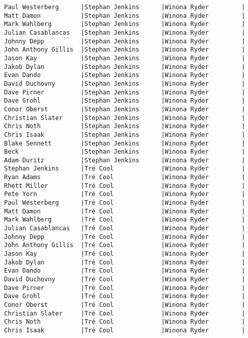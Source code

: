 \documentclass{article}
\begin{document}
\begin{verbatim}
Paul Westerberg      |Stephan Jenkins      |Winona Ryder         |
Matt Damon           |Stephan Jenkins      |Winona Ryder         |
Mark Wahlberg        |Stephan Jenkins      |Winona Ryder         |
Julian Casablancas   |Stephan Jenkins      |Winona Ryder         |
Johnny Depp          |Stephan Jenkins      |Winona Ryder         |
John Anthony Gillis  |Stephan Jenkins      |Winona Ryder         |
Jason Kay            |Stephan Jenkins      |Winona Ryder         |
Jakob Dylan          |Stephan Jenkins      |Winona Ryder         |
Evan Dando           |Stephan Jenkins      |Winona Ryder         |
David Duchovny       |Stephan Jenkins      |Winona Ryder         |
Dave Pirner          |Stephan Jenkins      |Winona Ryder         |
Dave Grohl           |Stephan Jenkins      |Winona Ryder         |
Conor Oberst         |Stephan Jenkins      |Winona Ryder         |
Christian Slater     |Stephan Jenkins      |Winona Ryder         |
Chris Noth           |Stephan Jenkins      |Winona Ryder         |
Chris Isaak          |Stephan Jenkins      |Winona Ryder         |
Blake Sennett        |Stephan Jenkins      |Winona Ryder         |
Beck                 |Stephan Jenkins      |Winona Ryder         |
Adam Duritz          |Stephan Jenkins      |Winona Ryder         |
Stephan Jenkins      |Tré Cool             |Winona Ryder         |
Ryan Adams           |Tré Cool             |Winona Ryder         |
Rhett Miller         |Tré Cool             |Winona Ryder         |
Pete Yorn            |Tré Cool             |Winona Ryder         |
Paul Westerberg      |Tré Cool             |Winona Ryder         |
Matt Damon           |Tré Cool             |Winona Ryder         |
Mark Wahlberg        |Tré Cool             |Winona Ryder         |
Julian Casablancas   |Tré Cool             |Winona Ryder         |
Johnny Depp          |Tré Cool             |Winona Ryder         |
John Anthony Gillis  |Tré Cool             |Winona Ryder         |
Jason Kay            |Tré Cool             |Winona Ryder         |
Jakob Dylan          |Tré Cool             |Winona Ryder         |
Evan Dando           |Tré Cool             |Winona Ryder         |
David Duchovny       |Tré Cool             |Winona Ryder         |
Dave Pirner          |Tré Cool             |Winona Ryder         |
Dave Grohl           |Tré Cool             |Winona Ryder         |
Conor Oberst         |Tré Cool             |Winona Ryder         |
Christian Slater     |Tré Cool             |Winona Ryder         |
Chris Noth           |Tré Cool             |Winona Ryder         |
Chris Isaak          |Tré Cool             |Winona Ryder         |

\end{verbatim}
\end{document}
